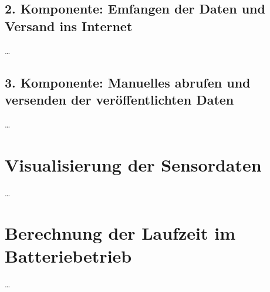 \subsection{2. Komponente: Emfangen der Daten und Versand ins Internet} \label{Empfänger}

\ldots

\subsection{3. Komponente: Manuelles abrufen und versenden der veröffentlichten Daten} \label{PubSub}

\ldots


\section{Visualisierung der Sensordaten} \label{Dashboard und Visualisierung}

\ldots


\section{Berechnung der Laufzeit im Batteriebetrieb} \label{Simulation}

\ldots
